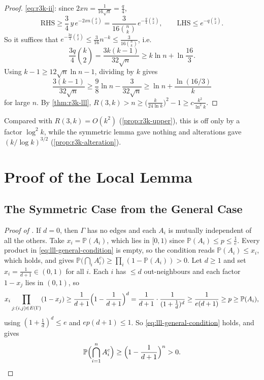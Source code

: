 \begin{proof}
    \eqref{eq:r3k-ii}: since \(2 x n = \frac{1}{16 \sqrt{n}} = \frac{q}{4}\),
    \[
        \text{RHS} \ge \frac{3}{4} \, y \, e^{-2 x n \binom{k}{2}} = \frac{3}{16 \binom{n}{k}} \, e^{-\frac{q}{4} \binom{k}{2}},
        \qquad
        \text{LHS} \le e^{-q \binom{k}{2}} .
    \]
    So it suffices that \(e^{-\frac{3q}{4} \binom{k}{2}} \le \frac{3}{16} n^{-k} \le \frac{3}{16 \binom{n}{k}}\), i.e.\
    \[
        \frac{3 q}{4} \binom{k}{2} = \frac{3 k (k-1)}{32 \sqrt{n}} \ge k \ln n + \ln \frac{16}{3} .
    \]
    Using \(k - 1 \ge 12 \sqrt{n} \ln n - 1\), dividing by \(k\) gives
    \[
        \frac{3 (k-1)}{32 \sqrt{n}} \ge \frac{9}{8} \ln n - \frac{3}{32 \sqrt{n}} \ge \ln n + \frac{\ln(16/3)}{k}
    \]
    for large \(n\). By \autoref{thm:r3k-lll}, \(R(3,k) > n \ge \bigl( \frac{k}{24 \ln k} \bigr)^{2} - 1 \ge c \frac{k^{2}}{\ln^{2} k}\).
\end{proof}

Compared with \(R(3,k) = O(k^{2})\) (\autoref{prop:r3k-upper}), this is off only by a factor \(\log^{2} k\), while the symmetric lemma gave nothing and alterations gave \((k/\log k)^{3/2}\) (\autoref{prop:r3k-alteration}).

\section{Proof of the Local Lemma}\label{sec:lll-proof}

\subsection{The Symmetric Case from the General Case}\label{sec:lll-symmetric-from-general}

\begin{proof}[Proof of {}]
    If \(d = 0\), then \(\Gamma\) has no edges and each \(A_{i}\) is mutually independent of all the others. Take \(x_{i} = \mathbb{P}(A_{i})\), which lies in \([0,1)\) since \(\mathbb{P}(A_{i}) \le p \le \frac{1}{e}\). Every product in \eqref{eq:lll-general-condition} is empty, so the condition reads \(\mathbb{P}(A_{i}) \le x_{i}\), which holds, and  gives \(\mathbb{P}\bigl( \bigcap_{i} A_{i}^{c} \bigr) \ge \prod_{i} (1 - \mathbb{P}(A_{i})) > 0\). Let \(d \ge 1\) and set \(x_{i} = \frac{1}{d+1} \in (0,1)\) for all \(i\). Each \(i\) has \(\le d\) out-neighbours and each factor \(1 - x_{j}\) lies in \((0,1)\), so
    \[
        x_{i} \prod_{j : (i,j) \in E(\Gamma)} (1 - x_{j})
        \ge \frac{1}{d+1} \Bigl( 1 - \frac{1}{d+1} \Bigr)^{d}
        = \frac{1}{d+1} \cdot \frac{1}{(1 + \frac{1}{d})^{d}}
        \ge \frac{1}{e (d+1)}
        \ge p
        \ge \mathbb{P}(A_{i}),
    \]
    using \((1 + \frac{1}{d})^{d} \le e\) and \(e p (d+1) \le 1\). So \eqref{eq:lll-general-condition} holds, and  gives
    \[
        \mathbb{P}\Bigl( \bigcap_{i=1}^{n} A_{i}^{c} \Bigr) \ge \Bigl( 1 - \frac{1}{d+1} \Bigr)^{n} > 0 . \qedhere
    \]
\end{proof}

